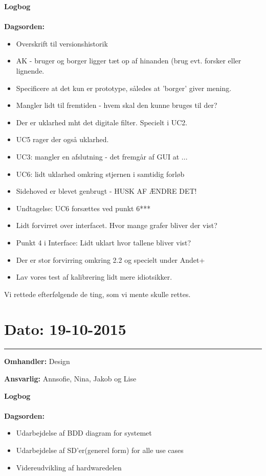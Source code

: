 \textbf{Logbog}
\\
\\
\textbf{Dagsorden:}
\begin{itemize}
	\item Overskrift til versionshistorik
	\item AK - bruger og borger ligger tæt op af hinanden (brug evt. forsker eller lignende.
	\item Specificere at det kun er prototype, således at 'borger' giver mening.
	\item Mangler lidt til fremtiden - hvem skal den kunne bruges til der?
	\item Der er uklarhed mht det digitale filter. Specielt i UC2.
	\item UC5 rager der også uklarhed.
	\item UC3: mangler en afslutning - det fremgår af GUI at ...
	\item UC6: lidt uklarhed omkring stjernen i samtidig forløb
	\item Sidehoved er blevet genbrugt - HUSK AF ÆNDRE DET!
	\item Undtagelse: UC6 forsættes ved punkt 6***
	\item Lidt forvirret over interfacet. Hvor mange grafer bliver der vist? 
	\item Punkt 4 i Interface: Lidt uklart hvor tallene bliver vist?
	\item Der er stor forvirring omkring 2.2 og specielt under Andet+
	\item Lav vores test af kalibrering lidt mere idiotsikker. 
\end{itemize}

Vi rettede efterfølgende de ting, som vi mente skulle rettes.

	


\section{Dato: 19-10-2015 }
\hrule

\textbf{Omhandler:} Design 

\textbf{Ansvarlig:} Annsofie, Nina, Jakob og Lise

\textbf{Logbog}
\\
\\
\textbf{Dagsorden:}
\begin{itemize}
	\item Udarbejdelse af BDD diagram for systemet
	\item Udarbejdelse af SD'er(generel form) for alle use cases
	\item Videreudvikling af hardwaredelen
\end{itemize}

